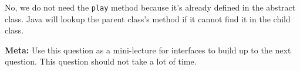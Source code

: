 \begin{parts}
\begin{blocksection}
\begin{solution}[0.5in]
No, we do not need the \lstinline$play$ method because it's already defined in
the abstract class. Java will lookup the parent class's method if it cannot
find it in the child class.
\end{solution}
\end{blocksection}

\end{parts}

\begin{solution}
\textbf{Meta:} Use this question as a mini-lecture for interfaces to build up
to the next question. This question should not take a lot of time.
\end{solution}
